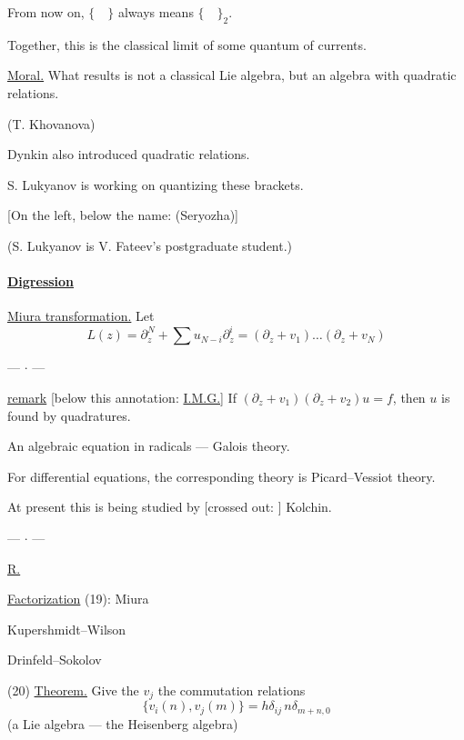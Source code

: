 From now on, $\{\quad\}$ always means $\{\quad\}_2$.

Together, this is the classical limit of some quantum
 of currents.

\underline{Moral.} What results is not a classical Lie algebra, but an algebra with
quadratic relations.

(T. Khovanova)

Dynkin also introduced quadratic relations.

S. Lukyanov is working on quantizing these brackets.

[On the left, below the name: (Seryozha)]

(S. Lukyanov is V. Fateev's postgraduate student.)

\paragraph*{\underline{Digression}}
\underline{Miura transformation.} Let
\begin{equation*}
L(z)=\partial_z^N+\sum u_{N-i}\partial_z^i
=(\partial_z+v_1)\ldots(\partial_z+v_N) \tag{19}
\end{equation*}
\begin{center}--- $\cdot$ ---\end{center}
\underline{remark} [below this annotation: \underline{I.M.G.}]
If $(\partial_z+v_1)(\partial_z+v_2)u=f$, then $u$ is found by quadratures.

An algebraic equation in radicals --- Galois theory.

For differential equations, the corresponding theory is Picard--Vessiot theory.

At present this is being studied by
[crossed out: ]
Kolchin.
\begin{center}--- $\cdot$ ---\end{center}
\underline{R.}

\underline{Factorization} (19): Miura

\hspace{3em}Kupershmidt--Wilson

\hspace{3em}Drinfeld--Sokolov

(20) \underline{Theorem.} Give the $v_j$ the commutation relations
\begin{equation*}
\{v_i(n),v_j(m)\}=h\delta_{ij}\,n\delta_{m+n,0} \tag{21}
\end{equation*}
(a Lie algebra --- the
Heisenberg algebra)

